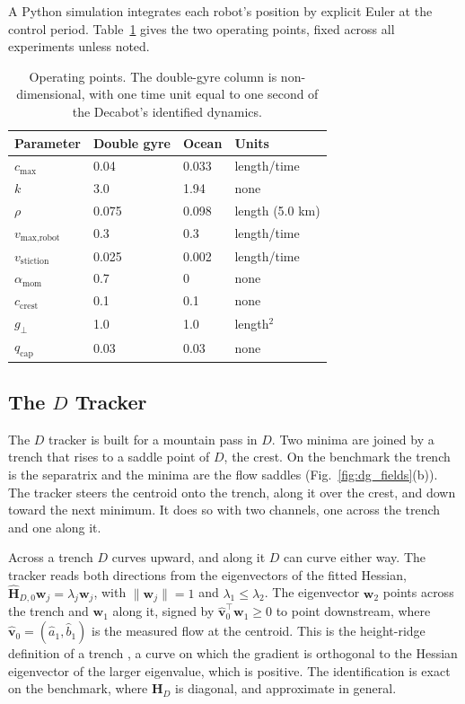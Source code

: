 \documentclass[lettersize,journal]{IEEEtran}
\begin{document}
A Python simulation integrates each robot's position by explicit Euler at
the control period. Table~\ref{tab:params} gives the two operating points,
fixed across all experiments unless noted.

\begin{table}[!t]
\caption{Operating points. The double-gyre column is non-dimensional,
with one time unit equal to one second of the Decabot's identified
dynamics.}
\label{tab:params}
\centering
\begin{tabular}{llll}
\hline
Parameter & Double gyre & Ocean & Units \\
\hline
$c_{\max}$              & 0.04  & 0.033  & length/time \\
$k$                     & 3.0   & 1.94   & none \\
$\rho$                  & 0.075 & 0.098  & length (5.0 km) \\
$v_{\text{max,robot}}$  & 0.3   & 0.3    & length/time \\
$v_{\text{stiction}}$   & 0.025 & 0.002  & length/time \\
$\alpha_{\text{mom}}$   & 0.7   & 0      & none \\
$c_{\mathrm{crest}}$    & 0.1   & 0.1    & none \\
$g_\perp$              & 1.0   & 1.0    & length$^2$ \\
$q_{\mathrm{cap}}$      & 0.03  & 0.03   & none \\
\hline
\end{tabular}
\end{table}

\subsection{The $D$ Tracker}
\label{sec:sep_controller}

The $D$ tracker is built for a mountain pass in $D$. Two minima are
joined by a trench that rises to a saddle point of $D$, the crest. On the
benchmark the trench is the separatrix and the minima are the flow saddles
(Fig.~\ref{fig:dg_fields}(b)). The tracker steers the centroid onto the
trench, along it over the crest, and down toward the next minimum. It
does so with two channels, one across the trench and one along it.

Across a trench $D$ curves upward, and along it $D$ can curve either way.
The tracker reads both directions from the eigenvectors of the fitted
Hessian, $\hat{\mathbf{H}}_{D,0}\mathbf{w}_j = \lambda_j \mathbf{w}_j$,
with $\|\mathbf{w}_j\| = 1$ and $\lambda_1 \leq \lambda_2$. The
eigenvector $\mathbf{w}_2$ points across the trench and $\mathbf{w}_1$
along it, signed by $\hat{\mathbf{v}}_0^\top \mathbf{w}_1 \geq 0$ to point
downstream, where $\hat{\mathbf{v}}_0 = (\hat{a}_1, \hat{b}_1)$ is the
measured flow at the centroid. This is the height-ridge definition of a
trench \cite{33}, a curve on which the gradient is orthogonal to the
Hessian eigenvector of the larger eigenvalue, which is positive. The identification is exact on the
benchmark, where $\mathbf{H}_D$ is diagonal, and approximate in general.
\end{document}
